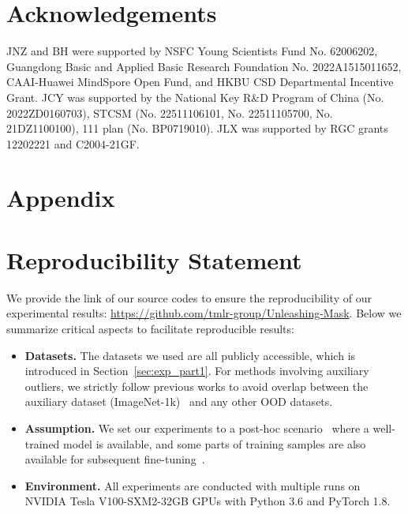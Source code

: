 \documentclass{article}
\theoremstyle{plain}
\theoremstyle{definition}
\theoremstyle{remark}
\begin{document}
\section*{Acknowledgements}

JNZ and BH were supported by NSFC Young Scientists Fund No. 62006202, Guangdong Basic and Applied Basic Research Foundation No. 2022A1515011652, CAAI-Huawei MindSpore Open Fund, and HKBU CSD Departmental Incentive Grant. JCY was supported by the National Key R\&D Program of China (No. 2022ZD0160703),  STCSM (No. 22511106101, No. 22511105700, No. 21DZ1100100), 111 plan (No. BP0719010). JLX was supported by RGC grants 12202221 and C2004-21GF.

\clearpage





\newpage
\appendix
\onecolumn


\section*{Appendix}


\section*{Reproducibility Statement}

We provide the link of our source codes to ensure the reproducibility of our experimental results: \url{https://github.com/tmlr-group/Unleashing-Mask}. Below we summarize critical aspects to facilitate reproducible results:

\begin{itemize}
    \item \textbf{Datasets.}  The datasets we used are all publicly accessible, which is introduced in Section~\ref{sec:exp_part1}. For methods involving auxiliary outliers, we strictly follow previous works \citep{sun2021react, du2022vos} to avoid overlap between the auxiliary dataset (ImageNet-1k)~\citep{deng2009imagenet} and any other OOD datasets.
    \item \textbf{Assumption.} We set our experiments to a post-hoc scenario~\citep{liu2020energy} where a well-trained model is available, and some parts of training samples are also available for subsequent fine-tuning~\citep{hendrycks2018deep}.
\item \textbf{Environment.} All experiments are conducted with multiple runs on NVIDIA Tesla V100-SXM2-32GB GPUs with Python 3.6 and PyTorch 1.8.
\end{itemize}
\end{document}
